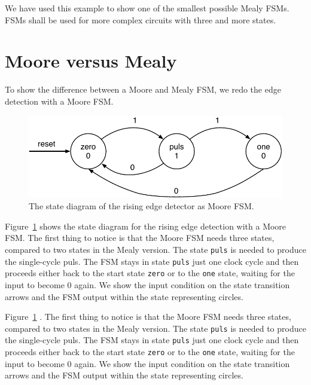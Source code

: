 \documentclass[%
    10pt,
    headinclude, footexclude,
    openright, %
    notitlepage,
    cleardoubleempty,
    headsepline,
    pointlessnumbers,
    bibtotoc, idxtotoc,
    ]{scrbook}
\newcommand{\code}[1]{{\small{\texttt{#1}}}}
\newcommand{\scale}{0.7}
\begin{document}
We have used this example to show one of the smallest possible Mealy FSMs.
FSMs shall be used for more complex circuits with three and more states.

\section{Moore versus Mealy}

To show the difference between a Moore and Mealy FSM, we redo the edge
detection with a Moore FSM. 

\begin{figure}
  \centering
  \includegraphics[scale=\scale]{figures/state-diag-rising-moore}
  \caption{The state diagram of the rising edge detector as Moore FSM.}
  \label{fig:diag:rising:moore}
\end{figure}

Figure~\ref{fig:diag:rising:moore} shows the state diagram for the rising
edge detection with a Moore FSM. The first thing to notice is that the Moore FSM
needs three states, compared to two states in the Mealy version.
The state \code{puls} is needed to produce the single-cycle puls.
The FSM stays in state \code{puls} just one clock cycle and then
proceeds either back to the start state \code{zero} or to the \code{one}
state, waiting for the input to become 0 again.
We show the input condition on the state transition arrows and the
FSM output within the state representing circles.

Figure~\ref{fig:diag:rising:moore} . The first thing to notice is that the Moore FSM
needs three states, compared to two states in the Mealy version.
The state \code{puls} is needed to produce the single-cycle puls.
The FSM stays in state \code{puls} just one clock cycle and then
proceeds either back to the start state \code{zero} or to the \code{one}
state, waiting for the input to become 0 again.
We show the input condition on the state transition arrows and the
FSM output within the state representing circles.

\end{document}
